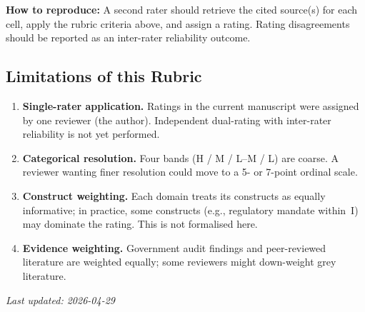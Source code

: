 \medskip
\noindent\textbf{How to reproduce:} A second rater should retrieve the cited source(s) for each cell, apply the rubric criteria above, and assign a rating. Rating disagreements should be reported as an inter-rater reliability outcome.

\bigskip


\subsection*{Limitations of this Rubric}

\begin{enumerate}
\item \textbf{Single-rater application.} Ratings in the current manuscript were assigned by one reviewer (the author). Independent dual-rating with inter-rater reliability is not yet performed.
\item \textbf{Categorical resolution.} Four bands (H / M / L--M / L) are coarse. A reviewer wanting finer resolution could move to a 5- or 7-point ordinal scale.
\item \textbf{Construct weighting.} Each domain treats its constructs as equally informative; in practice, some constructs (e.g., regulatory mandate within~I) may dominate the rating. This is not formalised here.
\item \textbf{Evidence weighting.} Government audit findings and peer-reviewed literature are weighted equally; some reviewers might down-weight grey literature.
\end{enumerate}

\noindent\textit{Last updated: 2026-04-29}
